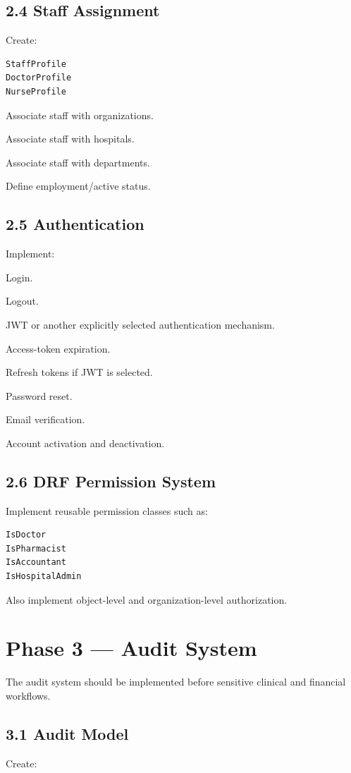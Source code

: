\documentclass[11pt,a4paper]{article}
\newcommand{\task}[1]{\item[$\square$] #1}
\begin{document}
\subsection{2.4 Staff Assignment}

Create:

\begin{lstlisting}
StaffProfile
DoctorProfile
NurseProfile
\end{lstlisting}

\task{Associate staff with organizations.}
\task{Associate staff with hospitals.}
\task{Associate staff with departments.}
\task{Define employment/active status.}

\subsection{2.5 Authentication}

Implement:

\task{Login.}
\task{Logout.}
\task{JWT or another explicitly selected authentication mechanism.}
\task{Access-token expiration.}
\task{Refresh tokens if JWT is selected.}
\task{Password reset.}
\task{Email verification.}
\task{Account activation and deactivation.}

\subsection{2.6 DRF Permission System}

Implement reusable permission classes such as:

\begin{lstlisting}
IsDoctor
IsPharmacist
IsAccountant
IsHospitalAdmin
\end{lstlisting}

Also implement object-level and organization-level authorization.

\section{Phase 3 --- Audit System}

The audit system should be implemented before sensitive clinical and
financial workflows.

\subsection{3.1 Audit Model}

Create:
\end{document}
